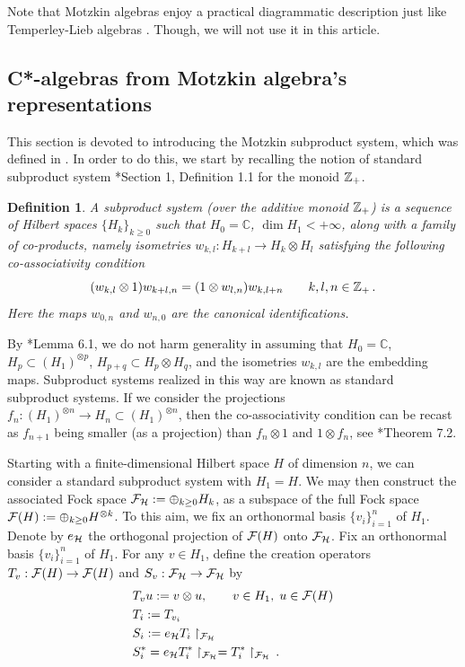 \documentclass[12pt, a4paper]{amsart}
\def\dim{\operatorname{dim}}
\newcommand{\IC}[0]{\mathbb{C}} \newcommand{\ID}[0]{\mathbb{D}}
\newtheorem{definition}[theorem]{Definition}
\numberwithin{equation}{section}
\begin{document}
Note that Motzkin algebras enjoy a practical diagrammatic description just like Temperley-Lieb algebras \cite{Jo21}. 
Though, we will not use it in this article.
 
\subsection{C*-algebras from Motzkin algebra's representations}

This section is devoted to introducing the Motzkin subproduct system, which was defined in \cite{ADR01}. In order to do this, we start by recalling the notion of standard 
subproduct system \cite{Shalit}*{Section 1, Definition 1.1} for the monoid $\mathbb{Z}_+$.

 \begin{definition}\label{defsub}
A  subproduct system (over the additive monoid $\mathbb{Z}_+$) is a sequence of Hilbert spaces $\{H_k\}_{k\geq 0}$ such that $H_0=\IC$, 
$\dim H_1<+\infty$, along with a family of 
co-products, namely 
isometries $w_{k,l}: H_{k+l}\to H_k\otimes H_l$ satisfying
the following co-associativity condition
$$
(w_{k,l}\otimes 1)w_{k+l,n}= (1\otimes w_{l,n})w_{k,l+n}\qquad k, l, n\in \mathbb{Z}_+\, . 
$$
Here the maps $w_{0,n}$  and $w_{n,0}$ are the canonical identifications.
\end{definition}

By \cite{Shalit}*{Lemma 6.1}, we do not harm generality in assuming that $H_0=\IC$, 
$H_p\subset (H_1)^{\otimes p}$,
$H_{p+q}\subset H_p\otimes H_q$,
and the isometries $w_{k,l}$ are the embedding maps. Subproduct systems realized in this way 
are known as  standard subproduct systems.
If we consider the projections $f_n: (H_1)^{\otimes n}\to H_n\subset (H_1)^{\otimes n}$, then the co-associativity condition can be recast as $f_{n+1}$ being smaller (as a projection) than $f_n\otimes 1$ and $1\otimes f_n$, see  \cite{GerholdSkeide}*{Theorem 7.2}.
 
Starting with a finite-dimensional Hilbert space $H$ of dimension $n$,
we can consider a standard subproduct system  with $H_1=H$.
We may then construct the associated Fock space $\mathcal{F}_{\mathcal{H}} :=\oplus_{k\geq 0} H_k$, 
 as a subspace of the full Fock space $\mathcal{F}(H):=\oplus_{k\geq 0} H^{\otimes k}$.
To this aim, we fix  an orthonormal basis $\{v_i\}_{i=1}^n$ of $H_1$. 
Denote by $e_{\mathcal{H}}$ the orthogonal projection of $\mathcal{F}(H)$ onto $\mathcal{F}_{\mathcal{H}}$.
Fix an orthonormal basis $\{v_i\}_{i=1}^n$ of $H_1$.
For any $v\in H_1$, define the creation operators $T_v: \mathcal{F}(H)\to \mathcal{F}(H)$ and
$S_v: \mathcal{F}_{\mathcal{H}}\to \mathcal{F}_{\mathcal{H}}$ by 
\begin{equation*}
\begin{aligned}
&T_v u := v \otimes u, \qquad v \in H_1, \; u \in \mathcal{F}(H)\\
&T_i:=T_{v_i}\\
&S_i:= e_{\mathcal{H}} T_i \upharpoonright_{\mathcal{F}_{\mathcal{H}}}\\
&S_i^* = e_{\mathcal{H}} T_i^* \upharpoonright_{\mathcal{F}_{\mathcal{H}}}=T_i^* \upharpoonright_{\mathcal{F}_{\mathcal{H}}}\,.
\end{aligned}
\end{equation*} 
\end{document}

